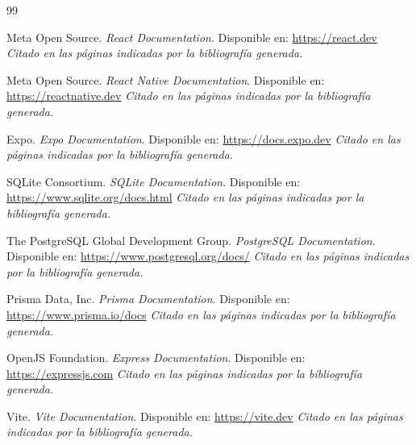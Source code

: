 \begin{thebibliography}{99}

Meta Open Source.
\textit{React Documentation}.
Disponible en: \url{https://react.dev}
\textit{Citado en las páginas indicadas por la bibliografía generada.}

Meta Open Source.
\textit{React Native Documentation}.
Disponible en: \url{https://reactnative.dev}
\textit{Citado en las páginas indicadas por la bibliografía generada.}

Expo.
\textit{Expo Documentation}.
Disponible en: \url{https://docs.expo.dev}
\textit{Citado en las páginas indicadas por la bibliografía generada.}

SQLite Consortium.
\textit{SQLite Documentation}.
Disponible en: \url{https://www.sqlite.org/docs.html}
\textit{Citado en las páginas indicadas por la bibliografía generada.}

The PostgreSQL Global Development Group.
\textit{PostgreSQL Documentation}.
Disponible en: \url{https://www.postgresql.org/docs/}
\textit{Citado en las páginas indicadas por la bibliografía generada.}

Prisma Data, Inc.
\textit{Prisma Documentation}.
Disponible en: \url{https://www.prisma.io/docs}
\textit{Citado en las páginas indicadas por la bibliografía generada.}

OpenJS Foundation.
\textit{Express Documentation}.
Disponible en: \url{https://expressjs.com}
\textit{Citado en las páginas indicadas por la bibliografía generada.}

Vite.
\textit{Vite Documentation}.
Disponible en: \url{https://vite.dev}
\textit{Citado en las páginas indicadas por la bibliografía generada.}

\end{thebibliography}

